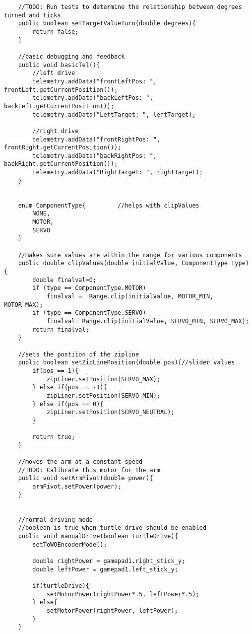\documentclass[11pt,fleqn]{article}
\begin{document}
\begin{verbatim}
    //TODO: Run tests to determine the relationship between degrees turned and ticks
    public boolean setTargetValueTurn(double degrees){
        return false;
    }

    //basic debugging and feedback
    public void basicTel(){
        //left drive
        telemetry.addData("frontLeftPos: ", frontLeft.getCurrentPosition());
        telemetry.addData("backLeftPos: ", backLeft.getCurrentPosition());
        telemetry.addData("LeftTarget: ", leftTarget);

        //right drive
        telemetry.addData("frontRightPos: ", frontRight.getCurrentPosition());
        telemetry.addData("backRightPos: ", backRight.getCurrentPosition());
        telemetry.addData("RightTarget: ", rightTarget);
    }


    enum ComponentType{         //helps with clipValues
        NONE,
        MOTOR,
        SERVO
    }

    //makes sure values are within the range for various components
    public double clipValues(double initialValue, ComponentType type) {
        double finalval=0;
        if (type == ComponentType.MOTOR)
            finalval =  Range.clip(initialValue, MOTOR_MIN, MOTOR_MAX);
        if (type == ComponentType.SERVO)
            finalval= Range.clip(initialValue, SERVO_MIN, SERVO_MAX);
        return finalval;
    }

    //sets the postiion of the zipline
    public boolean setZipLinePosition(double pos){//slider values
        if(pos == 1){
            zipLiner.setPosition(SERVO_MAX);
        } else if(pos == -1){
            zipLiner.setPosition(SERVO_MIN);
        } else if(pos == 0){
            zipLiner.setPosition(SERVO_NEUTRAL);
        }

        return true;
    }

    //moves the arm at a constant speed
    //TODO: Calibrate this motor for the arm
    public void setArmPivot(double power){
        armPivot.setPower(power);
    }


    //normal driving mode
    //boolean is true when turtle drive should be enabled
    public void manualDrive(boolean turtleDrive){
        setToWOEncoderMode();

        double rightPower = gamepad1.right_stick_y;
        double leftPower = gamepad1.left_stick_y;

        if(turtleDrive){
            setMotorPower(rightPower*.5, leftPower*.5);
        } else{
            setMotorPower(rightPower, leftPower);
        }
    }


\end{verbatim}
\end{document}
